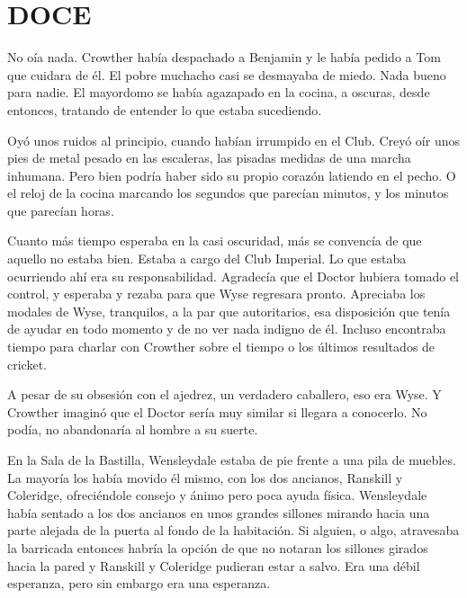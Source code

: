 \chapter*{DOCE}

{No oía nada. Crowther había despachado a Benjamin y le había pedido a
	Tom que cuidara de él. El pobre muchacho casi se desmayaba de miedo.
	Nada bueno para nadie. El mayordomo se había agazapado en la cocina, a
oscuras, desde entonces, tratando de entender lo que estaba sucediendo.}

{Oyó unos ruidos al principio, cuando habían irrumpido en el Club. Creyó
	oír unos pies de metal pesado en las escaleras, las pisadas medidas de
	una marcha inhumana. Pero bien podría haber sido su propio corazón
	latiendo en el pecho. O el reloj de la cocina marcando los segundos que
parecían minutos, y los minutos que parecían horas.}

{Cuanto más tiempo esperaba en la casi oscuridad, más se convencía de
	que aquello no estaba bien. Estaba a cargo del Club Imperial. Lo que
	estaba ocurriendo ahí era su responsabilidad. Agradecía que el Doctor
	hubiera tomado el control, y esperaba y rezaba para que Wyse regresara
	pronto. Apreciaba los modales de Wyse, tranquilos, a la par que
	autoritarios, esa disposición que tenía de ayudar en todo momento y de
	no ver nada indigno de él. Incluso encontraba tiempo para charlar con
Crowther sobre el tiempo o los últimos resultados de cricket.}

{A pesar de su obsesión con el ajedrez, un verdadero caballero, eso era
	Wyse. Y Crowther imaginó que el Doctor sería muy similar si llegara a
conocerlo. No podía, no abandonaría al hombre a su suerte.}

\mbox{}

{En la Sala de la Bastilla, Wensleydale estaba de pie frente a una pila
	de muebles. La mayoría los había movido él mismo, con los dos ancianos,
	Ranskill y Coleridge, ofreciéndole consejo y ánimo pero poca ayuda
	física. Wensleydale había sentado a los dos ancianos en unos grandes
	sillones mirando hacia una parte alejada de la puerta al fondo de la
	habitación. Si alguien, o algo, atravesaba la barricada entonces habría
	la opción de que no notaran los sillones girados hacia la pared y
	Ranskill y Coleridge pudieran estar a salvo. Era una débil esperanza,
pero sin embargo era una esperanza.}

